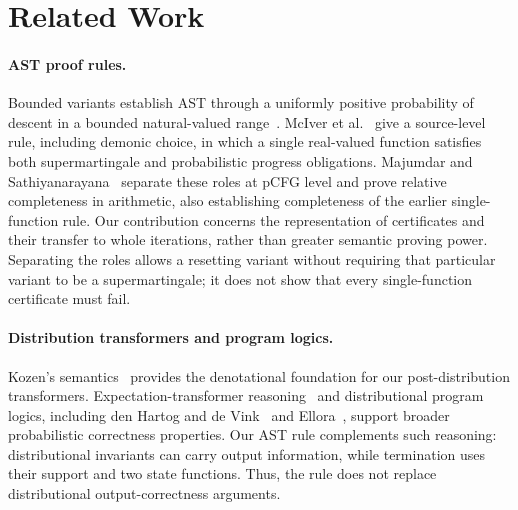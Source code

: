 \section{Related Work}
\label{sec:relwork}

\paragraph{AST proof rules.}
Bounded variants establish AST through a uniformly positive probability
of descent in a bounded natural-valued range~\cite{DBLP:series/mcs/McIverM05}.
McIver et al.~\cite{10.1145/3158121} give a source-level rule, including
demonic choice, in which a single real-valued function satisfies both
supermartingale and probabilistic progress obligations. Majumdar and
Sathiyanarayana~\cite{DBLP:journals/pacmpl/MajumdarS25} separate these roles
at pCFG level and prove relative completeness in arithmetic, also
establishing completeness of the earlier single-function rule.
Our contribution concerns the representation of certificates and their
transfer to whole iterations, rather than greater semantic proving power.
Separating the roles allows a resetting variant without requiring that
particular variant to be a supermartingale; it does not show that every
single-function certificate must fail.

\paragraph{Distribution transformers and program logics.}
Kozen's semantics~\cite{DBLP:conf/focs/Kozen79,DBLP:conf/stoc/Kozen83}
provides the denotational foundation for our post-distribution
transformers. Expectation-transformer reasoning~\cite{DBLP:series/mcs/McIverM05}
and distributional program logics, including den Hartog and de
Vink~\cite{DBLP:journals/ijfcs/HartogV02} and
Ellora~\cite{DBLP:conf/esop/BartheEGGHS18}, support broader probabilistic
correctness properties. Our AST rule complements such reasoning:
distributional invariants can carry output information, while termination
uses their support and two state functions. Thus, the rule does not
replace distributional output-correctness arguments.

